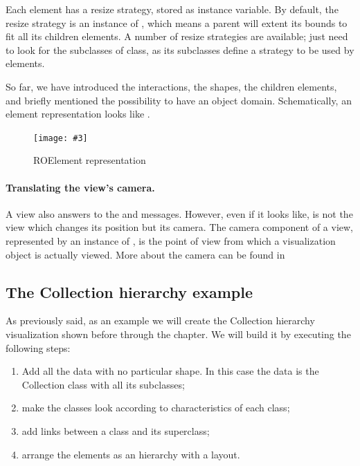 \documentclass[a4paper,10pt,twoside]{book}
\newcommand{\fig}[4]{
		\begin{figure}[#1]
			\centering
			\texttt{[image: \#3]}
			\caption{\label{fig:#3}#4}
		\end{figure}}
\begin{document}
Each element has a resize strategy, stored as  instance variable.
By default, the resize strategy is an instance of , which means a parent will extent its bounds to fit all its children elements. A number of resize strategies are available; just need to look for the subclasses of  class, as its subclasses define a strategy to be used by elements.

So far, we have introduced the interactions, the shapes, the children elements, and briefly mentioned the possibility to have an object domain. Schematically, an element representation looks like .

\fig{H}{0.5}{ROElementModel}{ROElement representation}

\paragraph{Translating the view's camera.}
A view also answers to the  and  messages. However, even if it looks like, is not the view which changes its position but its camera. The camera component of a view, represented by an instance of , is the point of view from which a visualization object is actually viewed. More about the camera can be found in 

\subsection*{The Collection hierarchy example}

As previously said, as an example we will create the Collection hierarchy visualization shown before through the chapter. We will build it by executing the following steps:
\begin{enumerate}
\item Add all the data with no particular shape. In this case the data is the Collection class with all its subclasses;
\item make the classes look according to characteristics of each class;
\item add links between a class and its superclass;
\item arrange the elements as an hierarchy with a layout.
\end{enumerate}
\end{document}
